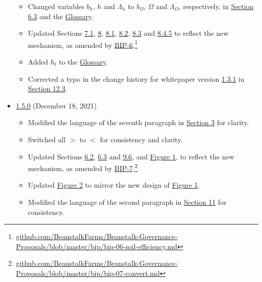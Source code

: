 \documentclass[class=article, crop=false]{standalone}
\begin{document}
\begin{itemize}[topsep=0pt, itemsep=3pt,leftmargin=16pt]
\begin{itemize}
        \item Changed variables $b_h$, $h$ and $\Lambda_h$ to $b_{\Omega}$, $\Omega$ and $\Lambda_{\Omega}$, respectively, in \hyperlink{subsection.6.3}{Section 6.3} and the \hyperlink{subsection.12.2}{Glossary}.
        \item Updated Sections \hyperlink{subsection.7.1}{7.1}, \hyperlink{section.8}{8}, \hyperlink{subsection.8.1}{8.1}, \hyperlink{subsection.8.2}{8.2}, \hyperlink{subsection.8.3}{8.3} and \hyperlink{subsubsection.8.4.5}{8.4.5} to reflect the new  mechanism, as amended by \href{https://github.com/BeanstalkFarms/Beanstalk-Governance-Proposals/blob/master/bip/bip-06-soil-efficiency.md}{BIP-6}.\footnote{\href{https://github.com/BeanstalkFarms/Beanstalk-Governance-Proposals/blob/master/bip/bip-06-soil-efficiency.md}{github.com/BeanstalkFarms/Beanstalk-Governance-Proposals/blob/master/bip/bip-06-soil-efficiency.md}}
        \item Added $h_t$ to the \hyperlink{subsection.12.2}{Glossary}. 
        \item Corrected a typo in the change history for whitepaper version \href{https://github.com/BeanstalkFarms/Beanstalk/blob/master/version-history/beanstalk1_3_1.pdf}{1.3.1} in \hyperlink{subsection.12.3}{Section 12.3}.
    \end{itemize}
    \item \href{https://github.com/BeanstalkFarms/Beanstalk/blob/master/version-history/beanstalk1_5_0.pdf}{1.5.0} (December 18, 2021)
    \begin{itemize}
        \item Modified the language of the seventh paragraph in \hyperlink{section.6.3}{Section 3} for clarity.
        \item Switched all $>$ to $<$ for consistency and clarity.
        \item Updated Sections \hyperlink{subsection.6.2}{6.2}, \hyperlink{subsection.6.3}{6.3} and \hyperlink{subsection.9.6}{9.6}, and \hyperref[fig 1]{Figure 1}, to reflect the new  mechanism, as amended by \href{https://github.com/BeanstalkFarms/Beanstalk-Governance-Proposals/blob/master/bip/bip-07-convert.md}{BIP-7}.\footnote{\href{https://github.com/BeanstalkFarms/Beanstalk-Governance-Proposals/blob/master/bip/bip-07-convert.md}{github.com/BeanstalkFarms/Beanstalk-Governance-Proposals/blob/master/bip/bip-07-convert.md}}
        \item Updated \hyperref[fig 2]{Figure 2} to mirror the new design of \hyperref[fig 1]{Figure 1}. 
        \item Modified the language of the second paragraph in \hyperlink{section.11}{Section 11} for consistency.

\end{itemize}
\end{itemize}
\end{document}
